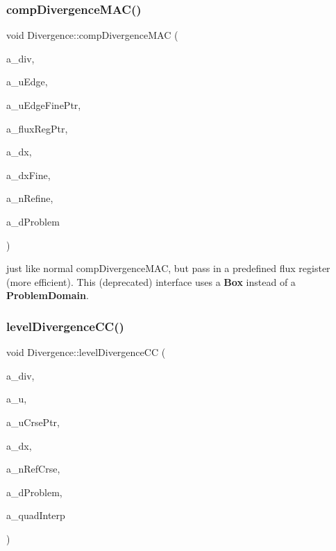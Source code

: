 \subsubsection{\texorpdfstring{comp\+Divergence\+M\+A\+C()}{compDivergenceMAC()}\hspace{0.1cm}{\footnotesize\ttfamily [4/4]}}
{\footnotesize\ttfamily void Divergence\+::comp\+Divergence\+M\+AC (\begin{DoxyParamCaption}\item[{\textbf{ Level\+Data}$<$ \textbf{ F\+Array\+Box} $>$ \&}]{a\+\_\+div,  }\item[{\textbf{ Level\+Data}$<$ \textbf{ Flux\+Box} $>$ \&}]{a\+\_\+u\+Edge,  }\item[{\textbf{ Level\+Data}$<$ \textbf{ Flux\+Box} $>$ $\ast$}]{a\+\_\+u\+Edge\+Fine\+Ptr,  }\item[{\textbf{ Level\+Flux\+Register} $\ast$}]{a\+\_\+flux\+Reg\+Ptr,  }\item[{const \textbf{ Real}}]{a\+\_\+dx,  }\item[{const \textbf{ Real} $\ast$}]{a\+\_\+dx\+Fine,  }\item[{const int}]{a\+\_\+n\+Refine,  }\item[{const \textbf{ Box} \&}]{a\+\_\+d\+Problem }\end{DoxyParamCaption})\hspace{0.3cm}{\ttfamily [static]}}

just like normal comp\+Divergence\+M\+AC, but pass in a predefined flux register (more efficient). This (deprecated) interface uses a \textbf{ Box} instead of a \textbf{ Problem\+Domain}. \mbox{\label{class_divergence_a85ddcbfb1ed4cd7e6624c33d0bd918f3}} 
\subsubsection{\texorpdfstring{level\+Divergence\+C\+C()}{levelDivergenceCC()}\hspace{0.1cm}{\footnotesize\ttfamily [1/3]}}
{\footnotesize\ttfamily void Divergence\+::level\+Divergence\+CC (\begin{DoxyParamCaption}\item[{\textbf{ Level\+Data}$<$ \textbf{ F\+Array\+Box} $>$ \&}]{a\+\_\+div,  }\item[{\textbf{ Level\+Data}$<$ \textbf{ F\+Array\+Box} $>$ \&}]{a\+\_\+u,  }\item[{\textbf{ Level\+Data}$<$ \textbf{ F\+Array\+Box} $>$ $\ast$}]{a\+\_\+u\+Crse\+Ptr,  }\item[{const \textbf{ Real}}]{a\+\_\+dx,  }\item[{const int}]{a\+\_\+n\+Ref\+Crse,  }\item[{const \textbf{ Problem\+Domain} \&}]{a\+\_\+d\+Problem,  }\item[{const bool}]{a\+\_\+quad\+Interp }\end{DoxyParamCaption})\hspace{0.3cm}{\ttfamily [static]}}

